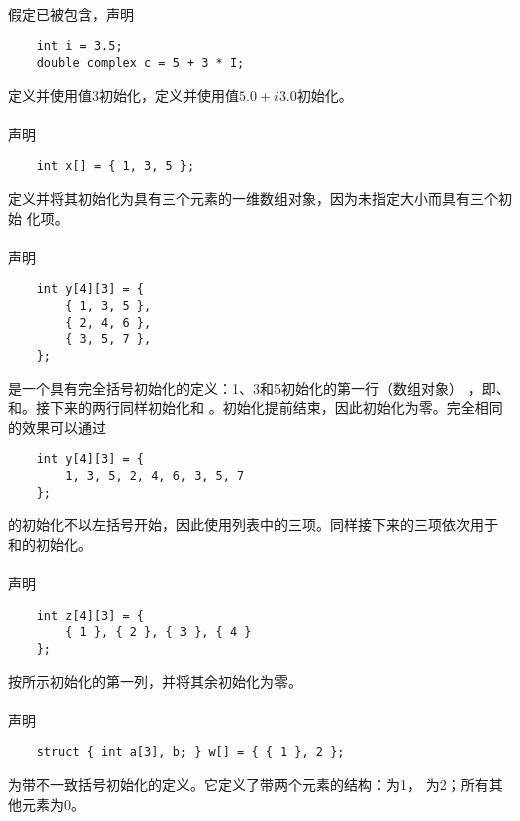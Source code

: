\paragraph{}
\ex 假定已被包含，声明
\begin{lstlisting}
    int i = 3.5;
    double complex c = 5 + 3 * I;
\end{lstlisting}
定义并使用值3初始化，定义并使用值$5.0+i3.0$初始化。

\paragraph{}
\ex 声明
\begin{lstlisting}
    int x[] = { 1, 3, 5 };
\end{lstlisting}
定义并将其初始化为具有三个元素的一维数组对象，因为未指定大小而具有三个初始
化项。

\paragraph{}
\ex 声明
\begin{lstlisting}
    int y[4][3] = {
        { 1, 3, 5 },
        { 2, 4, 6 },
        { 3, 5, 7 },
    };
\end{lstlisting}
是一个具有完全括号初始化的定义：1、3和5初始化的第一行（数组对象）
，即、和。接下来的两行同样初始化和
。初始化提前结束，因此初始化为零。完全相同的效果可以通过
\begin{lstlisting}
    int y[4][3] = {
        1, 3, 5, 2, 4, 6, 3, 5, 7
    };
\end{lstlisting}
的初始化不以左括号开始，因此使用列表中的三项。同样接下来的三项依次用于
和的初始化。

\paragraph{}
\ex 声明
\begin{lstlisting}
    int z[4][3] = {
        { 1 }, { 2 }, { 3 }, { 4 }
    };
\end{lstlisting}
按所示初始化的第一列，并将其余初始化为零。

\paragraph{}
\ex 声明
\begin{lstlisting}
    struct { int a[3], b; } w[] = { { 1 }, 2 };
\end{lstlisting}
为带不一致括号初始化的定义。它定义了带两个元素的结构：为1，
为2；所有其他元素为0。

